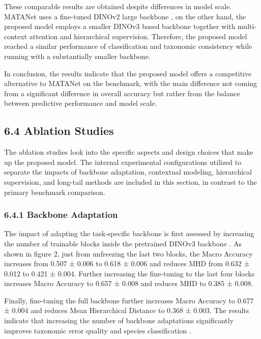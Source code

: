 \documentclass[preprint,12pt]{elsarticle}
\begin{document}
These comparable results are obtained despite differences in model
scale. MATANet uses a fine-tuned DINOv2 large backbone
\cite{ref47}, on the other hand, the proposed
model employs a smaller DINOv3 based backbone
\cite{ref25} together with multi-context
attention and hierarchical supervision. Therefore, the proposed model
reached a similar performance of classification and taxonomic
consistency while running with a substantially smaller backbone.

In conclusion, the results indicate that the proposed model offers a
competitive alternative to MATANet on the benchmark, with the main
difference not coming from a significant difference in overall accuracy
but rather from the balance between predictive performance and model
scale.

\subsection*{6.4 Ablation Studies}\label{ablation-studies}

The ablation studies look into the specific aspects and design choices
that make up the proposed model. The internal experimental
configurations utilized to separate the impacts of backbone adaptation,
contextual modeling, hierarchical supervision, and long-tail methods are
included in this section, in contrast to the primary benchmark
comparison.

\subsubsection*{6.4.1 Backbone Adaptation}\label{backbone-adaptation}

The impact of adapting the task-specific backbone is first assessed by
increasing the number of trainable blocks inside the pretrained DINOv3
backbone \cite{ref25}. As shown in figure 2,
just from unfreezing the last two blocks, the Macro Accuracy increases
from 0.507 ± 0.006 to 0.618 ± 0.006 and reduces MHD from 0.632 ± 0.012
to 0.421 ± 0.004. Further increasing the fine-tuning to the last four
blocks increases Macro Accuracy to 0.657 ± 0.008 and reduces MHD to
0.385 ± 0.008.

Finally, fine-tuning the full backbone further increases Macro Accuracy
to 0.677 ± 0.004 and reduces Mean Hierarchical Distance to 0.368 ±
0.003. The results indicate that increasing the number of backbone
adaptations significantly improves taxonomic error quality and species
classification \cite{ref51}.
\end{document}
